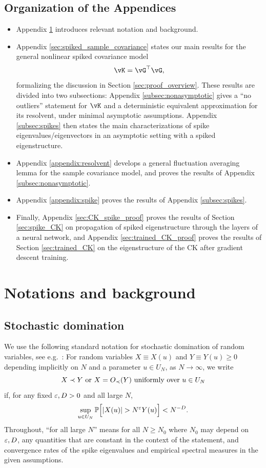 \newpage
\subsection*{Organization of the Appendices}
\begin{itemize}[leftmargin=*]
\item Appendix \ref{appendix:background} introduces relevant notation and background.
\item Appendix \ref{sec:spiked_sample_covariance} states our main results for the general nonlinear spiked covariance model
\[\vK=\vG^\top \vG,\]
formalizing the discussion in Section \ref{sec:proof_overview}. These results
are divided into two subsections: Appendix \ref{subsec:nonasymptotic} gives a
``no outliers'' statement for $\vK$ and a deterministic equivalent approximation
for its resolvent, under minimal asymptotic assumptions.
Appendix \ref{subsec:spikes} then states the main characterizations of spike
eigenvalues/eigenvectors in an asymptotic setting with a spiked eigenstructure.
\item Appendix \ref{appendix:resolvent} develops a general fluctuation averaging
lemma for the sample covariance model, and proves the results of
Appendix \ref{subsec:nonasymptotic}.
\item Appendix \ref{appendix:spike} proves the
results of Appendix \ref{subsec:spikes}.
\item Finally, Appendix \ref{sec:CK_spike_proof} proves the results of Section \ref{sec:spike_CK}
on propagation of spiked eigenstructure through the layers of a neural network, and
Appendix \ref{sec:trained_CK_proof} proves the results of Section
\ref{sec:trained_CK} on the eigenstructure of the CK after gradient descent
training.
\end{itemize}

\bigskip

\section{Notations and background}\label{appendix:background}

\subsection{Stochastic domination}

We use the following standard notation for stochastic domination of random
variables, see e.g.\ \cite[Definition 2.4]{erdHos2013averaging}:
For random variables $X \equiv X(u)$ and $Y \equiv Y(u) \geq 0$ depending implicitly on $N$
and a parameter $u \in U_N$, as $N \to \infty$, we write
\[X \prec Y \text{ or } X=\SD{Y} \text{ uniformly over } u \in U_N\]
if, for any fixed $\varepsilon,D>0$ and all large $N$,
\[\sup_{u\in U_N}\P \Big[|X(u)|>N^\eps Y(u)\Big]<N^{-D}.\]
Throughout, ``for all large $N$'' means for all $N \geq N_0$ where
$N_0$ may depend on $\varepsilon,D$, any quantities that are constant in the context
of the statement, and convergence rates of the spike eigenvalues and
empirical spectral measures in the given assumptions.

